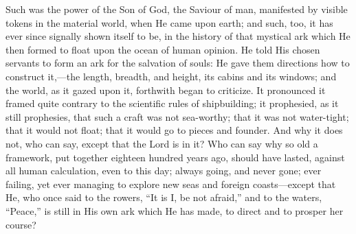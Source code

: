 Such was the power of the Son of God, the Saviour of
man, manifested by visible tokens in the material world,
when He came upon earth; and such, too, it has ever since
signally shown itself to be, in the history of that
mystical ark which He then formed to float upon the ocean
of human opinion. He told His chosen servants to form an
ark for the salvation of souls: He gave them directions
how to construct it,—the length, breadth, and
height, its cabins and its windows; and the world, as it
gazed upon it, forthwith began to criticize. It
pronounced it framed quite contrary to the scientific
rules of shipbuilding; it prophesied, as it still
prophesies, that such a craft was not sea-worthy; that it
was not water-tight; that it would not float; that it
would go to pieces and founder. And why it does not, who
can say, except that the Lord is in it? Who can say why
so old a framework, put together eighteen hundred years
ago, should have lasted, against all human calculation,
even to this day; always going, and never gone; ever
failing, yet ever managing to explore new seas and
foreign coasts—except that He, who once said to the
rowers, ``It is I, be not afraid,'' and to the
waters, ``Peace,'' is still in His own ark which
He has made, to direct and to prosper her course?


